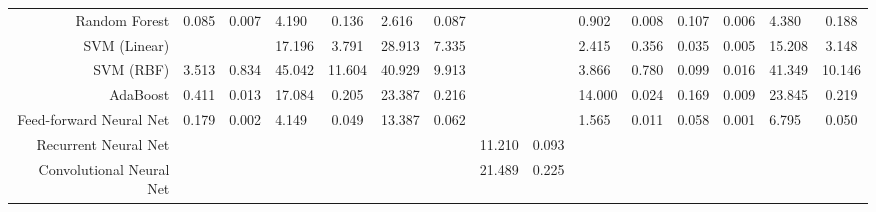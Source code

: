 \documentclass[letterpaper]{article}
\begin{document}
\begin{landscape}
\begin{table}[t!]
\begin{tabular}{@{}r|lclclclclclclc@{}}
			Random Forest             & 0.085                     & 0.007 & 4.190                     & 0.136 & 2.616                     & 0.087 &                           &         & 0.902                         & 0.008   & 0.107                        & 0.006   & 4.380                        & 0.188         \\
			SVM (Linear)              &                           &       & 17.196                    & 3.791 & 28.913                    & 7.335 &                           &         & 2.415                         & 0.356   & 0.035                        & 0.005   & 15.208                       & 3.148         \\
			SVM (RBF)                 & 3.513                     & 0.834 & 45.042                    & 11.604& 40.929                    & 9.913 &                           &         & 3.866                         & 0.780   & 0.099                        & 0.016   & 41.349                       & 10.146        \\
			AdaBoost                  & 0.411                     & 0.013 & 17.084                    & 0.205 & 23.387                    & 0.216 &                           &         & 14.000                        & 0.024   & 0.169                        & 0.009   & 23.845                       & 0.219         \\
			Feed-forward Neural Net   & 0.179                     & 0.002 & 4.149                     & 0.049 & 13.387                    & 0.062 &                           &         & 1.565                         & 0.011   & 0.058                        & 0.001   & 6.795                        & 0.050         \\
			Recurrent Neural Net      &                           &       &                           &       &                           &       & 11.210                    & 0.093   &                               &         &                              &         &                              &               \\
			Convolutional Neural Net  &                           &       &                           &       &                           &       & 21.489                    & 0.225   &                               &         &                              &         &                              &               \\ \bottomrule
		\end{tabular}
	\end{table}
\end{landscape}

\clearpage

% 
% 


\end{document}
